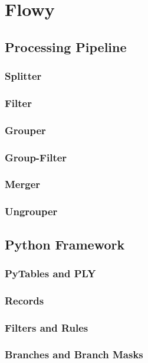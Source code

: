 \chapter{Flowy}\label{ch:flowy-design}

\section{Processing Pipeline}\label{sec:processing-pipeline}
  \subsection{Splitter}\label{subsec:splitter}
  \subsection{Filter}\label{subsec:filter}
  \subsection{Grouper}\label{subsec:grouper}
  \subsection{Group-Filter}\label{subsec:group-filter}
  \subsection{Merger}\label{subsec:merger}
  \subsection{Ungrouper}\label{subsec:ungrouper}

\section{Python Framework}\label{sec:python-framework}
	\subsection{PyTables and PLY}\label{subsec:pytable-ply}
	\subsection{Records}\label{subsec:records}
	\subsection{Filters and Rules}\label{subsec:filters-rules}
	\subsection{Branches and Branch Masks}\label{subsec:branches-branchmasks}